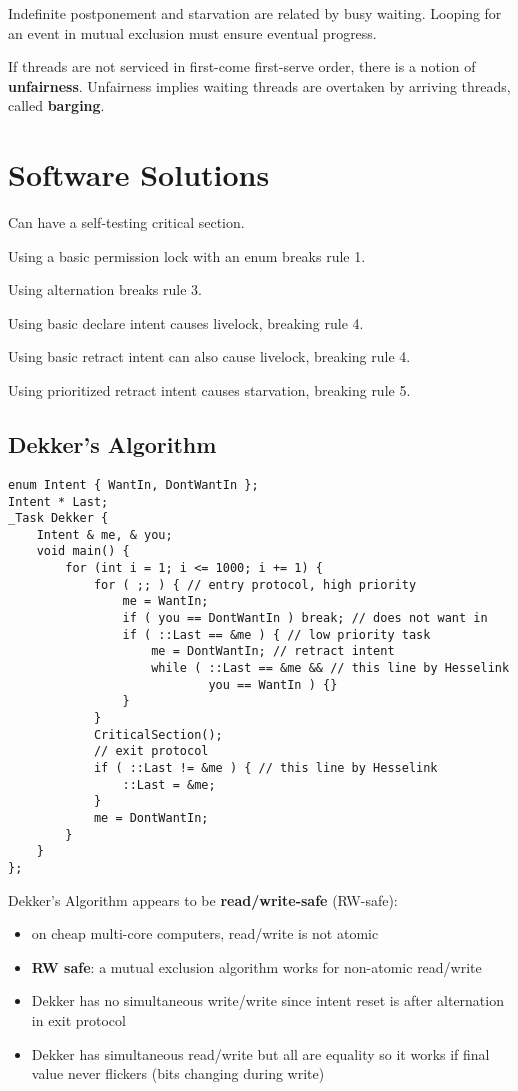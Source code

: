\documentclass[11pt]{article}
\begin{document}
Indefinite postponement and starvation are related by busy waiting.
Looping for an event in mutual exclusion must ensure eventual progress.

If threads are not serviced in first-come first-serve order, there is a notion of \textbf{unfairness}.
Unfairness implies waiting threads are overtaken by arriving threads, called \textbf{barging}.
\section{Software Solutions}
\label{sec:orge32f783}
Can have a self-testing critical section.

Using a basic permission lock with an enum breaks rule 1.

Using alternation breaks rule 3.

Using basic declare intent causes livelock, breaking rule 4.

Using basic retract intent can also cause livelock, breaking rule 4.

Using prioritized retract intent causes starvation, breaking rule 5.
\subsection{Dekker's Algorithm}
\label{sec:org20c3729}
\begin{verbatim}
enum Intent { WantIn, DontWantIn };
Intent * Last;
_Task Dekker {
    Intent & me, & you;
    void main() {
        for (int i = 1; i <= 1000; i += 1) {
            for ( ;; ) { // entry protocol, high priority
                me = WantIn;
                if ( you == DontWantIn ) break; // does not want in
                if ( ::Last == &me ) { // low priority task
                    me = DontWantIn; // retract intent
                    while ( ::Last == &me && // this line by Hesselink
                            you == WantIn ) {}
                }
            }
            CriticalSection();
            // exit protocol
            if ( ::Last != &me ) { // this line by Hesselink
                ::Last = &me;
            }
            me = DontWantIn;
        }
    }
};
\end{verbatim}

Dekker's Algorithm appears to be \textbf{read/write-safe} (RW-safe):
\begin{itemize}
\item on cheap multi-core computers, read/write is not atomic
\item \textbf{RW safe}: a mutual exclusion algorithm works for non-atomic read/write
\item Dekker has no simultaneous write/write since intent reset is after alternation in exit protocol
\item Dekker has simultaneous read/write but all are equality so it works if final value never flickers
(bits changing during write)
\end{itemize}
\end{document}
